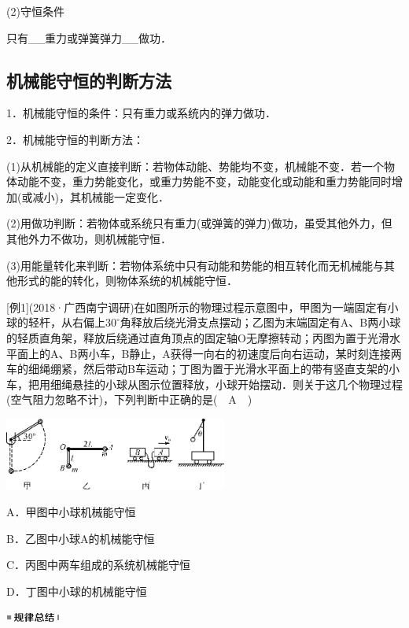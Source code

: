 \documentclass[cn,10.5pt,chinese,mac,chinesefont=founder]{elegantbook}
\begin{document}
(2)守恒条件

只有\_\_重力或弹簧弹力\_\_做功．


\newpage
\subsection{机械能守恒的判断方法}

1．机械能守恒的条件：只有重力或系统内的弹力做功．

2．机械能守恒的判断方法：

(1)从机械能的定义直接判断：若物体动能、势能均不变，机械能不变．若一个物体动能不变，重力势能变化，或重力势能不变，动能变化或动能和重力势能同时增加(或减小)，其机械能一定变化．

(2)用做功判断：若物体或系统只有重力(或弹簧的弹力)做功，虽受其他外力，但其他外力不做功，则机械能守恒．

(3)用能量转化来判断：若物体系统中只有动能和势能的相互转化而无机械能与其他形式的能的转化，则物体系统的机械能守恒．

{[}例1{]}(2018·广西南宁调研)在如图所示的物理过程示意图中，甲图为一端固定有小球的轻杆，从右偏上$30^\circ$角释放后绕光滑支点摆动；乙图为末端固定有A、B两小球的轻质直角架，释放后绕通过直角顶点的固定轴O无摩擦转动；丙图为置于光滑水平面上的A、B两小车，B静止，A获得一向右的初速度后向右运动，某时刻连接两车的细绳绷紧，然后带动B车运动；丁图为置于光滑水平面上的带有竖直支架的小车，把用细绳悬挂的小球从图示位置释放，小球开始摆动．则关于这几个物理过程(空气阻力忽略不计)，下列判断中正确的是(　A　)

\begin{center}\includegraphics[width=2.88681in,height=0.94306in]{media/image232.png}\end{center}

A．甲图中小球机械能守恒

B．乙图中小球A的机械能守恒

C．丙图中两车组成的系统机械能守恒

D．丁图中小球的机械能守恒

\begin{center}\includegraphics[width=0.70764in,height=0.12292in]{media/image44.png}\end{center}
\end{document}
